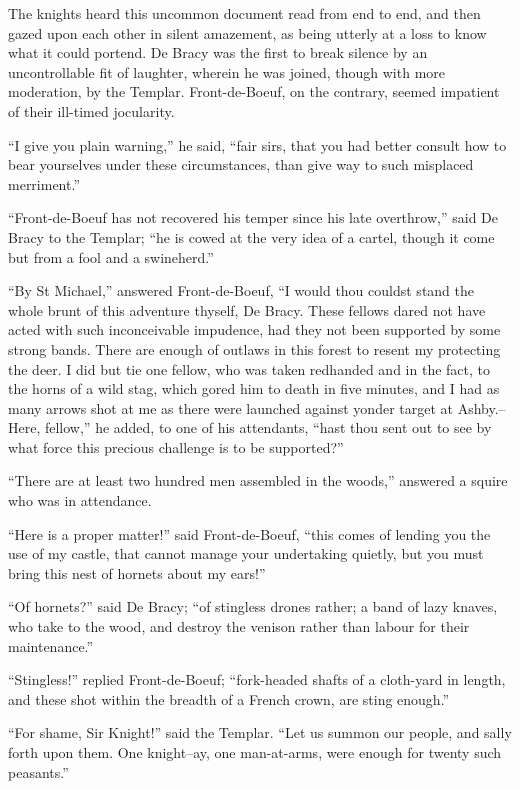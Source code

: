 The knights heard this uncommon document read from end to end, and then
gazed upon each other in silent amazement, as being utterly at a loss to
know what it could portend. De Bracy was the first to break silence by
an uncontrollable fit of laughter, wherein he was joined, though with
more moderation, by the Templar. Front-de-Boeuf, on the contrary, seemed
impatient of their ill-timed jocularity.

``I give you plain warning,'' he said, ``fair sirs, that you had better
consult how to bear yourselves under these circumstances, than give way
to such misplaced merriment.''

``Front-de-Boeuf has not recovered his temper since his late
overthrow,'' said De Bracy to the Templar; ``he is cowed at the very
idea of a cartel, though it come but from a fool and a swineherd.''

``By St Michael,'' answered Front-de-Boeuf, ``I would thou couldst stand
the whole brunt of this adventure thyself, De Bracy. These fellows dared
not have acted with such inconceivable impudence, had they not been
supported by some strong bands. There are enough of outlaws in this
forest to resent my protecting the deer. I did but tie one fellow, who
was taken redhanded and in the fact, to the horns of a wild stag, which
gored him to death in five minutes, and I had as many arrows shot at me
as there were launched against yonder target at Ashby.--Here, fellow,''
he added, to one of his attendants, ``hast thou sent out to see by what
force this precious challenge is to be supported?''

``There are at least two hundred men assembled in the woods,'' answered
a squire who was in attendance.

``Here is a proper matter!'' said Front-de-Boeuf, ``this comes of
lending you the use of my castle, that cannot manage your undertaking
quietly, but you must bring this nest of hornets about my ears!''

``Of hornets?'' said De Bracy; ``of stingless drones rather; a band of
lazy knaves, who take to the wood, and destroy the venison rather than
labour for their maintenance.''

``Stingless!'' replied Front-de-Boeuf; ``fork-headed shafts of a
cloth-yard in length, and these shot within the breadth of a French
crown, are sting enough.''

``For shame, Sir Knight!'' said the Templar. ``Let us summon our people,
and sally forth upon them. One knight--ay, one man-at-arms, were enough
for twenty such peasants.''

